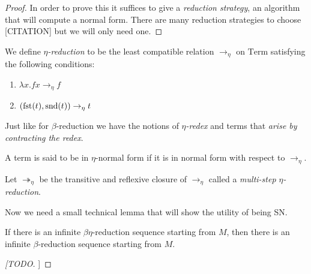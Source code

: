 \begin{proof}
    In order to prove this it suffices to give a \emph{reduction strategy}, an algorithm that will compute a normal form. There are many reduction strategies to choose [CITATION] but we will only need one.

\end{proof}



\begin{defin}
    We define \emph{$\eta$-reduction} to be the least compatible relation $\to_{\eta}$ on $\mathrm{Term}$ satisfying the following conditions:
    \begin{enumerate}
        \item $\lambda x . f x \to_{\eta} f$
        \item $(\mathrm{fst}(t), \mathrm{snd}(t)) \to_{\eta} t$
    \end{enumerate}
    Just like for $\beta$-reduction we have the notions of \emph{$\eta$-redex} and terms that \emph{arise by contracting the redex}.
\end{defin}

\begin{defin}
    A term is said to be in $\eta$-normal form if it is in normal form with respect to $\to_{\eta}$.
\end{defin}


\begin{defin}
    Let $\twoheadrightarrow_{\eta}$ be the transitive and reflexive closure of $\to_{\eta}$ called a \emph{multi-step $\eta$-reduction}.
\end{defin}




Now we need a small technical lemma that will show the utility of being SN.

\begin{lemma}
    If there is an infinite $\beta \eta$-reduction sequence starting from $M$, then there is an infinite $\beta$-reduction sequence starting from $M$.
\end{lemma}

\begin{proof}
    [[TODO]]
\end{proof}

